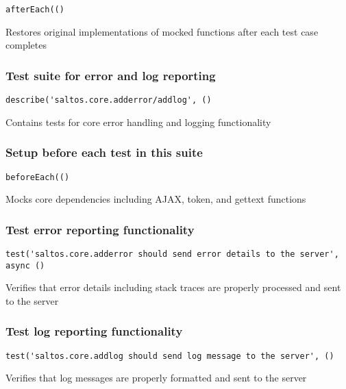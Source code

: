\documentclass[a4paper]{article}
\begin{document}
\begin{lstlisting}
afterEach(()
\end{lstlisting}

Restores original implementations of mocked functions
after each test case completes

\hypertarget{toc45}{}
\subsubsection{Test suite for error and log reporting}

\begin{lstlisting}
describe('saltos.core.adderror/addlog', ()
\end{lstlisting}

Contains tests for core error handling and logging functionality

\hypertarget{toc46}{}
\subsubsection{Setup before each test in this suite}

\begin{lstlisting}
beforeEach(()
\end{lstlisting}

Mocks core dependencies including AJAX, token, and gettext functions

\hypertarget{toc47}{}
\subsubsection{Test error reporting functionality}

\begin{lstlisting}
test('saltos.core.adderror should send error details to the server', async ()
\end{lstlisting}

Verifies that error details including stack traces are properly
processed and sent to the server

\hypertarget{toc48}{}
\subsubsection{Test log reporting functionality}

\begin{lstlisting}
test('saltos.core.addlog should send log message to the server', ()
\end{lstlisting}

Verifies that log messages are properly formatted and sent to the server
\end{document}
